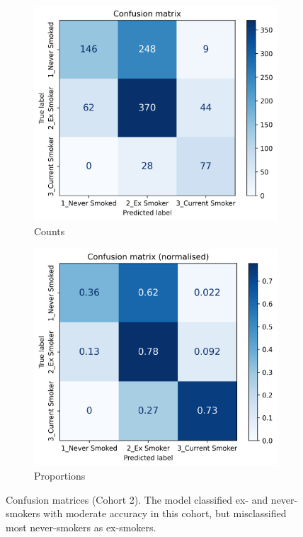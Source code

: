 \documentclass{article} %
\begin{document}
\begin{figure}[p]
    \centering
    \begin{subfigure}{0.49\linewidth}
        \centering
        \includegraphics[width=\linewidth]{cohort2/test_confusion_matrix.png}
        \caption{Counts}
    \end{subfigure}
    \hfill
    \begin{subfigure}{0.49\linewidth}
        \centering
        \includegraphics[width=\linewidth]{cohort2/test_confusion_matrix_normalised.png}
        \caption{Proportions}
    \end{subfigure}
    \caption[Confusion matrices (Cohort 2)]{Confusion matrices (Cohort 2). The model classified ex- and never-smokers with moderate accuracy in this cohort, but misclassified most never-smokers as ex-smokers.}
    \label{fig:cohort2-confusion-matrix}
\end{figure}
\end{document}
